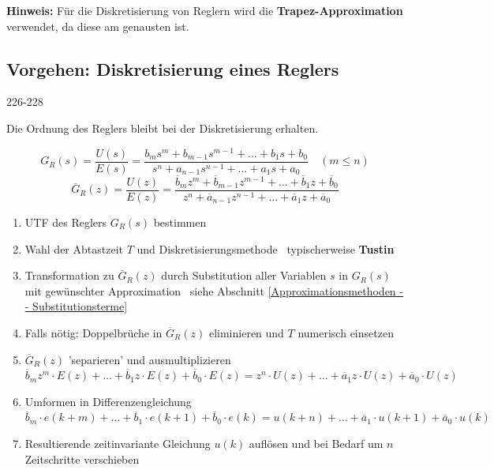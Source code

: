 \vspace{0.2cm}
\textbf{Hinweis:} Für die Diskretisierung von Reglern wird die \textbf{Trapez-Approximation} verwendet, da diese am genausten ist.


\subsection{Vorgehen: Diskretisierung eines Reglers}{226-228}

Die Ordnung des Reglers bleibt bei der Diskretisierung erhalten.

$$ G_R(s) = \frac{U(s)}{E(s)} = \frac{b_m s^m + b_{m-1} s^{m-1} + \ldots + b_1 s + b_0}{s^n + a_{n-1} s^{n-1} + \ldots + a_1 s + a_0} \quad (m \leq n) $$
$$ \overline{G}_R(z) = \frac{U(z)}{E(z)} = \frac{\overline{b}_m z^m + \overline{b}_{m-1} z^{m-1} + \ldots + \overline{b}_1 z + \overline{b}_0}{z^n + \overline{a}_{n-1} z^{n-1} + \ldots + \overline{a}_1 z + \overline{a}_0} $$

\begin{enumerate}
    \item UTF des Reglers $G_R(s)$ bestimmen
    \item Wahl der Abtastzeit $T$ und Diskretisierungsmethode \textrightarrow\ typischerweise \textbf{Tustin}
    \item Transformation zu $\overline{G}_R(z)$  durch Substitution aller Variablen $s$ in $G_R(s)$ mit gewünschter Approximation \textrightarrow\ siehe Abschnitt \ref{Approximationsmethoden -- Substitutionsterme}
    \item Falls nötig: Doppelbrüche in $\overline{G}_R(z)$ eliminieren und $T$ numerisch einsetzen
    \item $\overline{G}_R(z)$ 'separieren' und ausmultiplizieren \\
        $\overline{b}_m z^m \cdot E(z) + \ldots + \overline{b}_1 z \cdot E(z) + \overline{b}_0 \cdot E(z) = z^n \cdot U(z) + \ldots + \overline{a}_1 z \cdot U(z) + \overline{a}_0 \cdot U(z)$
    \item Umformen in Differenzengleichung \\
        $\overline{b}_m \cdot e(k+m)  + \ldots + \overline{b}_1 \cdot e(k+1) + \overline{b}_0 \cdot e(k) = u(k+n) + \ldots + \overline{a}_1 \cdot u(k+1) + \overline{a}_0 \cdot u(k)$
    \item Resultierende zeitinvariante Gleichung $u(k)$ auflösen und bei Bedarf um $n$ Zeitschritte verschieben
\end{enumerate}



